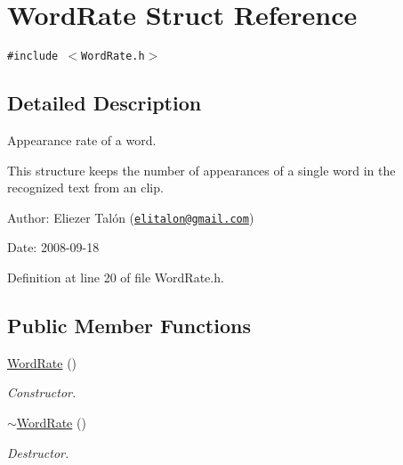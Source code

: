 \hypertarget{struct_word_rate}{
\section{WordRate Struct Reference}
\label{struct_word_rate}
}
{\tt \#include $<$WordRate.h$>$}



\subsection{Detailed Description}
Appearance rate of a word. 

This structure keeps the number of appearances of a single word in the recognized text from an clip.

\begin{Desc}
\item[Author:]Eliezer Talón (\href{mailto:elitalon@gmail.com}{\tt elitalon@gmail.com}) \end{Desc}
\begin{Desc}
\item[Date:]2008-09-18 \end{Desc}


Definition at line 20 of file WordRate.h.\subsection*{Public Member Functions}
\begin{CompactItemize}
\item 
\hyperlink{struct_word_rate_c22aaa0c04769cce44ba08bf5e6eb655}{WordRate} ()
\begin{CompactList}\small\item\em Constructor. \item\end{CompactList}\item 
\hyperlink{struct_word_rate_a86a63516e4c3d4e8aa9060ea5be6b23}{$\sim$WordRate} ()
\begin{CompactList}\small\item\em Destructor. \item\end{CompactList}\end{CompactItemize}
